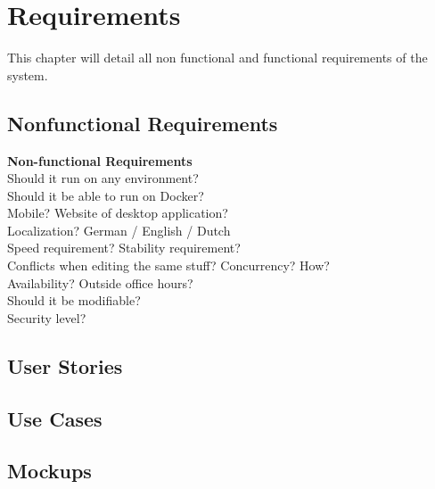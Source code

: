 \chapter{Requirements}
This chapter will detail all non functional and functional requirements of the system.

\section{Nonfunctional Requirements}


\textbf{Non-functional Requirements}\\	

Should it run on any environment?\\

Should it be able to run on Docker?\\

Mobile? Website of desktop application?\\

Localization? German / English / Dutch\\

Speed requirement? Stability requirement?\\

Conflicts when editing the same stuff? Concurrency? How?\\

Availability? Outside office hours?\\

Should it be modifiable?\\

Security level?

\section{User Stories}


\section{Use Cases}


\section{Mockups}
